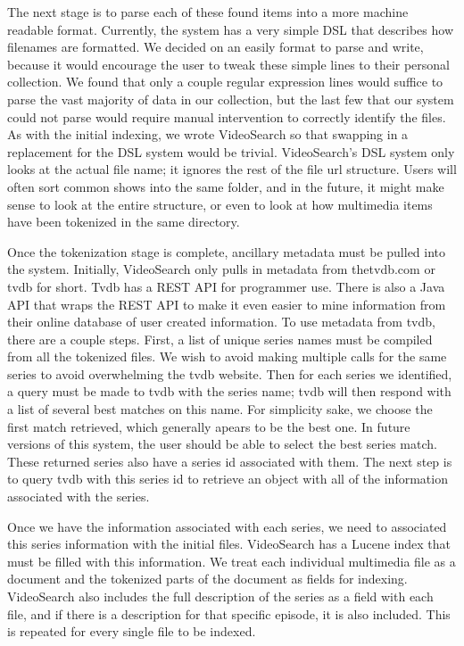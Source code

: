 \documentclass{acm_proc_article-sp}
\begin{document}
The next stage is to parse each of these found items into a more machine readable format.  Currently, the system has a very simple DSL that describes how filenames are formatted.  We decided on an easily format to parse and write, because it would encourage the user to tweak these simple lines to their personal collection.  \cite{favorite RE book} We found that only a couple regular expression lines would suffice to parse the vast majority of data in our collection, but the last few that our system could not parse would require manual intervention to correctly identify the files.  As with the initial indexing, we wrote VideoSearch so that swapping in a replacement for the DSL system would be trivial.  VideoSearch’s DSL system only looks at the actual file name; it ignores the rest of the file url structure.  Users will often sort common shows into the same folder, and in the future, it might make sense to look at the entire structure, or even to look at how multimedia items have been tokenized in the same directory.

Once the tokenization stage is complete, ancillary metadata must be pulled into the system.  Initially, VideoSearch only pulls in metadata from thetvdb.com or tvdb for short.  Tvdb has a REST API for programmer use. \cite{tvdb} There is also a Java API that wraps the REST API to make it even easier to mine information from their online database of user created information.  To use metadata from tvdb, there are a couple steps.  First, a list of unique series names must be compiled from all the tokenized files.  We wish to avoid making multiple calls for the same series to avoid overwhelming the tvdb website. Then for each series we identified, a query must be made to tvdb with the series name; tvdb will then respond with a list of several best matches on this name.  For simplicity sake, we choose the first match retrieved, which generally apears to be the best one. In future versions of this system, the user should be able to select the best series match.  These returned series also have a series id associated with them.  The next step is to query tvdb with this series id to retrieve an object with all of the information associated with the series.

Once we have the information associated with each series, we need to associated this series information with the initial files.  VideoSearch has a Lucene index that must be filled with this information.  We treat each individual multimedia file as a document and the tokenized parts of the document as fields for indexing.  VideoSearch also includes the full description of the series as a field with each file, and if there is a description for that specific episode, it is also included.  This is repeated for every single file to be indexed.
\end{document}
